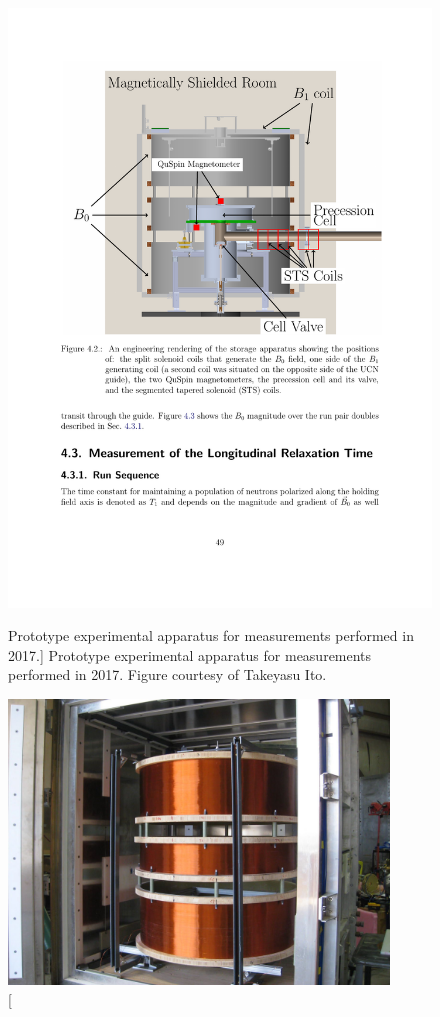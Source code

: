 \begin{figure}[hb]
\centering
\begin{minipage}{.45\textwidth}
    \centering
    \includegraphics[width=\textwidth]{figures/ramsey2017_apparatus.pdf}
    \caption
    [Prototype experimental apparatus for measurements performed in 2017.]
    {Prototype experimental apparatus for measurements performed in 2017. Figure courtesy of Takeyasu Ito.}
    \label{fig:ramsey_2017_apparatus}
\end{minipage}%
\hspace{10pt}
\begin{minipage}{.45\textwidth}
    \centering
    \includegraphics[width=0.9\textwidth]{figures/ramsey2017_B0_coil.jpg}

\end{minipage}
\end{figure}
